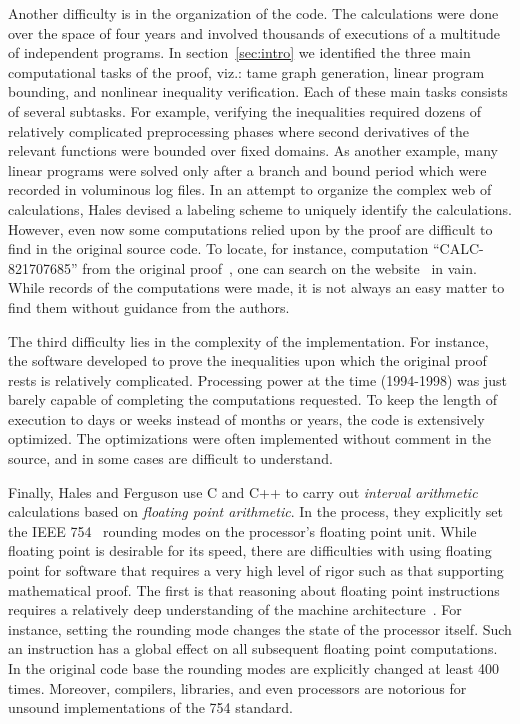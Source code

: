 \documentclass[11pt]{amsart}
\begin{document}
Another difficulty is in the organization of the code. The
calculations were done over the space of four years and involved
thousands of executions of a multitude of independent programs.  In
section~\ref{sec:intro} we identified the three main computational
tasks of the proof, viz.: tame graph generation, linear program
bounding, and nonlinear inequality verification.  Each of these main
tasks consists of several subtasks.  For example, verifying the
inequalities required dozens of relatively complicated preprocessing
phases where second derivatives of the relevant functions were bounded
over fixed domains.  As another example, many linear programs were
solved only after a branch and bound period which were recorded in
voluminous log files.  In an attempt to organize the complex 
web of calculations, Hales
devised a labeling scheme to uniquely identify the calculations.
However, even now some computations relied upon by the proof are
difficult to find in the original source code.  To locate, for
instance, computation ``CALC-821707685'' from the original
proof~\cite[p.159]{Hales:2006:DCG}, one can search on the
website~\cite{website:Hales:1998:Code} in vain.  While records of the
computations were made, it is not always an easy matter to find them
without guidance from the authors.

The third difficulty lies in the complexity of the implementation. For
instance, the software developed to prove the inequalities upon which
the original proof rests is relatively complicated. Processing power
at the time (1994-1998) was just barely capable of completing the
computations requested. To keep the length of execution to days or
weeks instead of months or years, the code is extensively
optimized. The optimizations were often implemented without comment in
the source, and in some cases are difficult to understand.

Finally, Hales and Ferguson use C and C++ to carry out \emph{interval
arithmetic} calculations based on \emph{floating point arithmetic}. In
the process, they explicitly set the IEEE 754~\cite{IEEE:1985:IEE754}
rounding modes on the processor's floating point unit.  While floating
point is desirable for its speed, there are difficulties with using
floating point for software that requires a very high level of rigor
such as that supporting mathematical proof.  The first is that
reasoning about floating point instructions requires a relatively deep
understanding of the machine architecture~\cite{Monniaux:2008:TOPLAS}.
For instance, setting the rounding mode changes the state of the
processor itself. Such an instruction has a global effect on all
subsequent floating point computations.  In the original code base the
rounding modes are explicitly changed at least 400 times.  Moreover,
compilers, libraries, and even processors are notorious for unsound
implementations of the 754 standard.  
\end{document}
